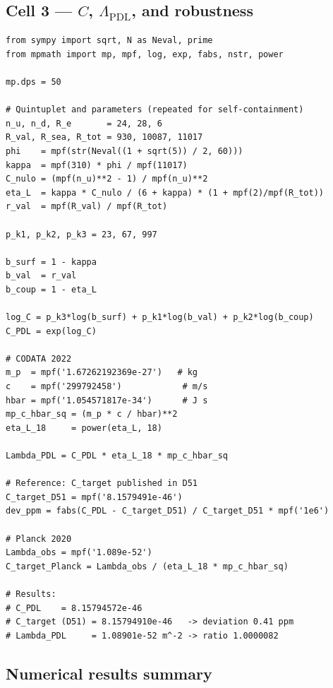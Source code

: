 \documentclass[12pt,a4paper]{article}
\theoremstyle{plain}
\theoremstyle{definition}
\theoremstyle{remark}
\newenvironment{codebox}[1][]{%
  \begin{tcolorbox}[breakable, codestyle, title={#1}]}{\end{tcolorbox}}
\begin{document}
\subsection{Cell 3 — \texorpdfstring{$C$, $\Lambda_{\mathrm{PDL}}$}{C, Lambda	extsubscript{PDL}}, and robustness}
\label{subsec:cell3}

\begin{codebox}[Cell~3: $C$, $\Lambda_{\mathrm{PDL}}$, deviation, and table of exclusion]
\begin{verbatim}
from sympy import sqrt, N as Neval, prime
from mpmath import mp, mpf, log, exp, fabs, nstr, power

mp.dps = 50

# Quintuplet and parameters (repeated for self-containment)
n_u, n_d, R_e       = 24, 28, 6
R_val, R_sea, R_tot = 930, 10087, 11017
phi    = mpf(str(Neval((1 + sqrt(5)) / 2, 60)))
kappa  = mpf(310) * phi / mpf(11017)
C_nulo = (mpf(n_u)**2 - 1) / mpf(n_u)**2
eta_L  = kappa * C_nulo / (6 + kappa) * (1 + mpf(2)/mpf(R_tot))
r_val  = mpf(R_val) / mpf(R_tot)

p_k1, p_k2, p_k3 = 23, 67, 997

b_surf = 1 - kappa
b_val  = r_val
b_coup = 1 - eta_L

log_C = p_k3*log(b_surf) + p_k1*log(b_val) + p_k2*log(b_coup)
C_PDL = exp(log_C)

# CODATA 2022
m_p  = mpf('1.67262192369e-27')   # kg
c    = mpf('299792458')            # m/s
hbar = mpf('1.054571817e-34')      # J s
mp_c_hbar_sq = (m_p * c / hbar)**2
eta_L_18     = power(eta_L, 18)

Lambda_PDL = C_PDL * eta_L_18 * mp_c_hbar_sq

# Reference: C_target published in D51
C_target_D51 = mpf('8.1579491e-46')
dev_ppm = fabs(C_PDL - C_target_D51) / C_target_D51 * mpf('1e6')

# Planck 2020
Lambda_obs = mpf('1.089e-52')
C_target_Planck = Lambda_obs / (eta_L_18 * mp_c_hbar_sq)

# Results:
# C_PDL    = 8.15794572e-46
# C_target (D51) = 8.15794910e-46   -> deviation 0.41 ppm
# Lambda_PDL     = 1.08901e-52 m^-2 -> ratio 1.0000082
\end{verbatim}
\end{codebox}

\subsection{Numerical results summary}
\label{subsec:numresults}
\end{document}
